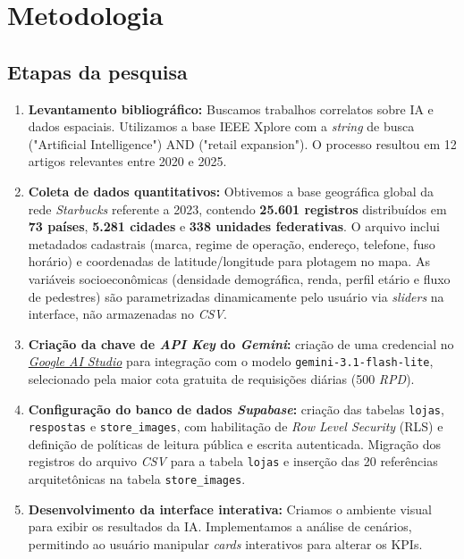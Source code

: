 \section{\esp Metodologia}


\subsection{\esp Etapas da pesquisa}

\begin{enumerate}
\item \textbf{Levantamento bibliográfico:} Buscamos trabalhos correlatos sobre IA e dados espaciais. Utilizamos a base IEEE Xplore com a \textit{string} de busca ("Artificial Intelligence") AND ("retail expansion"). O processo resultou em 12 artigos relevantes entre 2020 e 2025.

\item \textbf{Coleta de dados quantitativos:} Obtivemos a base geográfica global da rede \textit{Starbucks} referente a 2023, contendo \textbf{25.601 registros} distribuídos em \textbf{73 países}, \textbf{5.281 cidades} e \textbf{338 unidades federativas}. O arquivo inclui metadados cadastrais (marca, regime de operação, endereço, telefone, fuso horário) e coordenadas de latitude/longitude para plotagem no mapa. As variáveis socioeconômicas (densidade demográfica, renda, perfil etário e fluxo de pedestres) são parametrizadas dinamicamente pelo usuário via \textit{sliders} na interface, não armazenadas no \textit{CSV}.

\item \textbf{Criação da chave de \textit{API Key} do \textit{Gemini}:} criação de uma credencial no \href{https://aistudio.google.com/}{\textit{Google AI Studio}} para integração com o modelo \texttt{gemini-3.1-flash-lite}, selecionado pela maior cota gratuita de requisições diárias (500 \textit{RPD}).

\item \textbf{Configuração do banco de dados \textit{Supabase}:} criação das tabelas \texttt{lojas}, \texttt{respostas} e \texttt{store\_images}, com habilitação de \textit{Row Level Security} (RLS) e definição de políticas de leitura pública e escrita autenticada. Migração dos registros do arquivo \textit{CSV} para a tabela \texttt{lojas} e inserção das 20 referências arquitetônicas na tabela \texttt{store\_images}.

\item \textbf{Desenvolvimento da interface interativa:} Criamos o ambiente visual para exibir os resultados da IA. Implementamos a análise de cenários, permitindo ao usuário manipular \textit{cards} interativos para alterar os KPIs.


\end{enumerate}
